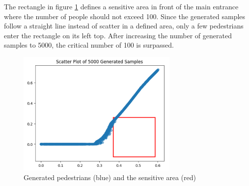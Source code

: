 The rectangle in figure \ref{fig:scatterGenRect} defines a sensitive area in front of the main entrance where the number of people should not exceed 100. Since the generated samples follow a straight line instead of scatter in a defined area, only a few pedestrians enter the rectangle on its left top. After increasing the number of generated samples to 5000, the critical number of 100 is surpassed.  

\begin{figure}[H]
    \centering
    \includegraphics[width=0.7\textwidth]{images/3-scatterGenRect.png}
    \caption{Generated pedestrians (blue) and the sensitive area (red)}
    \label{fig:scatterGenRect}
\end{figure}



